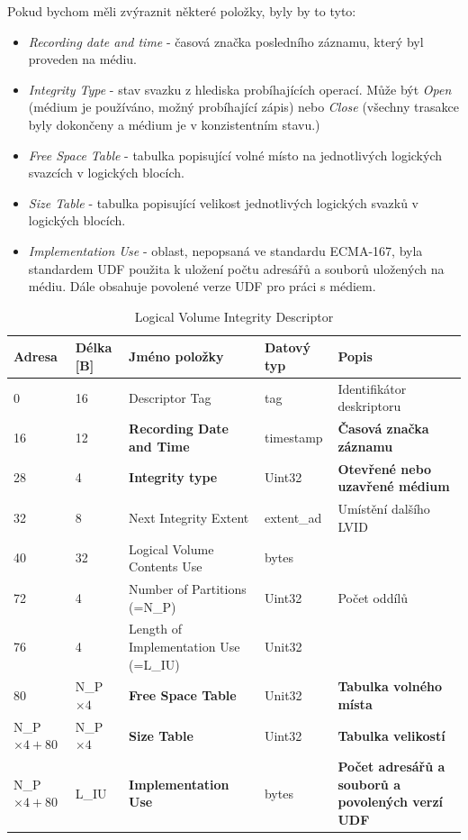 Pokud bychom měli zvýraznit některé položky, byly by to tyto:
\begin{itemize}
    \item \textit{Recording date and time} - časová značka posledního záznamu, který byl proveden na médiu.
    \item \textit{Integrity Type} - stav svazku z hlediska probíhajících operací. Může být \textit{Open} (médium je používáno, možný probíhající zápis) nebo \textit{Close} (všechny trasakce byly dokončeny a médium je v konzistentním stavu.)
    \item \textit{Free Space Table} - tabulka popisující volné místo na jednotlivých logických svazcích v logických blocích.
    \item \textit{Size Table} - tabulka popisující velikost jednotlivých logických svazků v logických blocích.
    \item \textit{Implementation Use} - oblast, nepopsaná ve standardu ECMA-167, byla standardem UDF použita k uložení počtu adresářů a souborů uložených na médiu. Dále obsahuje povolené verze UDF pro práci s médiem. 
\end{itemize}
\begin{table}[]
    \centering
    \begin{tabular}{ | l | l | p{3.7cm} | p{1.8cm} | p{4.2cm} | }
        \hline
        Adresa  & Délka [B]   & Jméno položky & Datový typ    & Popis \\ \hline\hline
        0   &16             & Descriptor Tag                    & tag           & Identifikátor deskriptoru \\ \hline
        16  &12             & \textbf{Recording Date and Time}  & timestamp     & \textbf{Časová značka záznamu} \\ \hline
        28  &4              & \textbf{Integrity type}           & Uint32        & \textbf{Otevřené nebo uzavřené médium} \\ \hline
        32  &8              & Next Integrity Extent             & extent\_ad    & Umístění dalšího LVID \\ \hline
        40  &32             & Logical Volume Contents Use       & bytes         &  \\ \hline
        72  &4              & Number of Partitions (=N\_P)      & Uint32        & Počet oddílů \\ \hline
        76  &4              & Length of Implementation Use (=L\_IU)& Unit32     &  \\ \hline
        80  &N\_P$\times4$  & \textbf{Free Space Table}         & Unit32        & \textbf{Tabulka volného místa} \\ \hline
        N\_P$\times4+80$ &N\_P$\times4$& \textbf{Size Table}    & Uint32        & \textbf{Tabulka velikostí} \\ \hline
        N\_P$\times4+80$ &L\_IU& \textbf{Implementation Use}    & bytes         & \textbf{Počet adresářů a souborů a povolených verzí UDF} \\ \hline
    \end{tabular}
    \caption{Logical Volume Integrity Descriptor\label{tab:lvid}}
\end{table}

